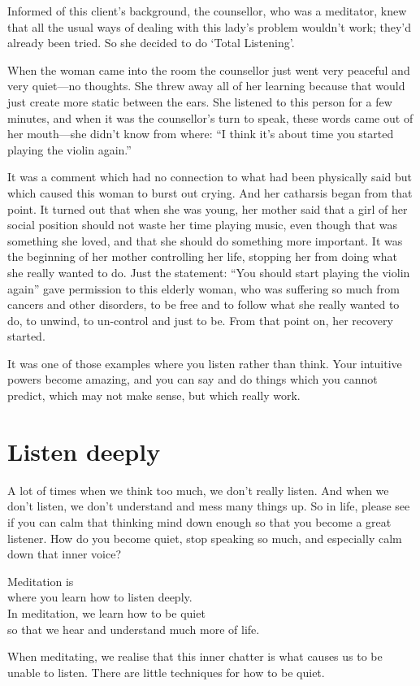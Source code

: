 \documentclass[12pt, openany]{book}
\newenvironment{aphorism}%
{%
\begin{center}\begin{itshape}
}%
{\end{itshape}\end{center}
}%
\begin{document}
Informed of this client’s background, the counsellor, who was a meditator, knew that all the usual ways of dealing with this lady’s problem wouldn’t work; they’d already been tried. So she decided to do ‘Total Listening’. 

When the woman came into the room the counsellor just went very peaceful and very quiet—no thoughts. She threw away all of her learning because that would just create more static between the ears. She listened to this person for a few minutes, and when it was the counsellor’s turn to speak, these words came out of her mouth—she didn’t know from where: “I think it’s about time you started playing the violin again.” 

It was a comment which had no connection to what had been physically said but which caused this woman to burst out crying. And her catharsis began from that point. It turned out that when she was young, her mother said that a girl of her social position should not waste her time playing music, even though that was something she loved, and that she should do something more important. It was the beginning of her mother controlling her life, stopping her from doing what she really wanted to do. Just the statement: “You should start playing the violin again” gave permission to this elderly woman, who was suffering so much from cancers and other disorders, to be free and to follow what she really wanted to do, to unwind, to un-control and just to be. From that point on, her recovery started. 

It was one of those examples where you listen rather than think. Your intuitive powers become amazing, and you can say and do things which you cannot predict, which may not make sense, but which really work. 

\section*{Listen deeply}

A lot of times when we think too much, we don’t really listen. And when we don’t listen, we don’t understand and mess many things up. So in life, please see if you can calm that thinking mind down enough so that you become a great listener. How do you become quiet, stop speaking so much, and especially calm down that inner voice? 

\begin{aphorism}
Meditation is\\  
where you learn how to listen deeply.\\ 
In meditation, we learn how to be quiet \\
so that we hear and understand much more of life.
\end{aphorism}When meditating, we realise that this inner chatter is what causes us to be unable to listen. There are little techniques for how to be quiet. 
\end{document}
